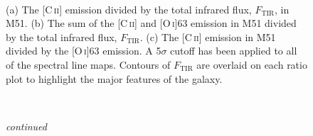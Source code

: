 \begin{figure}[!htbp]
\\
\caption[Maps of important line ratios in M51]{(a) The [C\,\textsc{ii}] emission divided by the total infrared flux, $F_{\mathrm{TIR}}$, in M51.  (b) The sum of the [C\,\textsc{ii}] and [O\,\textsc{i}]63 emission in M51 divided by the total infrared flux, $F_{\mathrm{TIR}}$.  (c) The [C\,\textsc{ii}] emission in M51 divided by the [O\,\textsc{i}]63 emission.  A 5$\sigma$ cutoff has been applied to all of the spectral line maps.  Contours of $F_{\mathrm{TIR}}$ are overlaid on each ratio plot to highlight the major features of the galaxy.}
\label{fig:ratio_plots}
\end{figure}
\begin{figure}[!htbp]
\ContinuedFloat
{}\\
\caption[]{\emph{continued}}
\end{figure}
